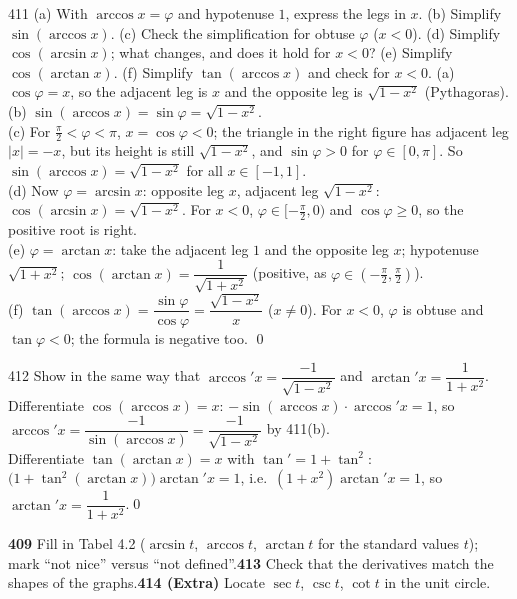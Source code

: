 \begin{bookex}{411}
(a) With $\arccos x=\varphi$ and hypotenuse $1$, express the legs in $x$. (b) Simplify $\sin(\arccos x)$. (c) Check the simplification for obtuse $\varphi$ ($x<0$). (d) Simplify $\cos(\arcsin x)$; what changes, and does it hold for $x<0$? (e) Simplify $\cos(\arctan x)$. (f) Simplify $\tan(\arccos x)$ and check for $x<0$.
\solution
(a) $\cos\varphi=x$, so the adjacent leg is $x$ and the opposite leg is $\sqrt{1-x^2}$ (Pythagoras).\\
(b) $\sin(\arccos x)=\sin\varphi=\sqrt{1-x^2}$.\\
(c) For $\frac\pi2<\varphi<\pi$, $x=\cos\varphi<0$; the triangle in the right figure has adjacent leg $|x|=-x$, but its height is still $\sqrt{1-x^2}$, and $\sin\varphi>0$ for $\varphi\in[0,\pi]$. So $\sin(\arccos x)=\sqrt{1-x^2}$ for all $x\in[-1,1]$.\\
(d) Now $\varphi=\arcsin x$: opposite leg $x$, adjacent leg $\sqrt{1-x^2}$: $\cos(\arcsin x)=\sqrt{1-x^2}$. For $x<0$, $\varphi\in[-\frac\pi2,0)$ and $\cos\varphi\ge0$, so the positive root is right.\\
(e) $\varphi=\arctan x$: take the adjacent leg $1$ and the opposite leg $x$; hypotenuse $\sqrt{1+x^2}$; $\cos(\arctan x)=\dfrac1{\sqrt{1+x^2}}$ (positive, as $\varphi\in(-\frac\pi2,\frac\pi2)$).\\
(f) $\tan(\arccos x)=\dfrac{\sin\varphi}{\cos\varphi}=\dfrac{\sqrt{1-x^2}}x$ ($x\ne0$). For $x<0$, $\varphi$ is obtuse and $\tan\varphi<0$; the formula is negative too. \checkmark\qed
\end{bookex}

\begin{bookex}{412}
Show in the same way that $\arccos'x=\dfrac{-1}{\sqrt{1-x^2}}$ and $\arctan'x=\dfrac1{1+x^2}$.
\solution
Differentiate $\cos(\arccos x)=x$: $-\sin(\arccos x)\cdot\arccos'x=1$, so $\arccos'x=\dfrac{-1}{\sin(\arccos x)}=\dfrac{-1}{\sqrt{1-x^2}}$ by 411(b).\\
Differentiate $\tan(\arctan x)=x$ with $\tan'=1+\tan^2$: $\big(1+\tan^2(\arctan x)\big)\arctan'x=1$, i.e.\ $(1+x^2)\arctan'x=1$, so $\arctan'x=\dfrac1{1+x^2}$.\qed
\end{bookex}

\begin{trybox}[{409, 413, 414 (Extra)}]
\textbf{409} Fill in Tabel 4.2 ($\arcsin t$, $\arccos t$, $\arctan t$ for the standard values $t$); mark ``not nice'' versus ``not defined''.\quad \textbf{413} Check that the derivatives match the shapes of the graphs.\quad \textbf{414 (Extra)} Locate $\sec t$, $\csc t$, $\cot t$ in the unit circle.
\end{trybox}

